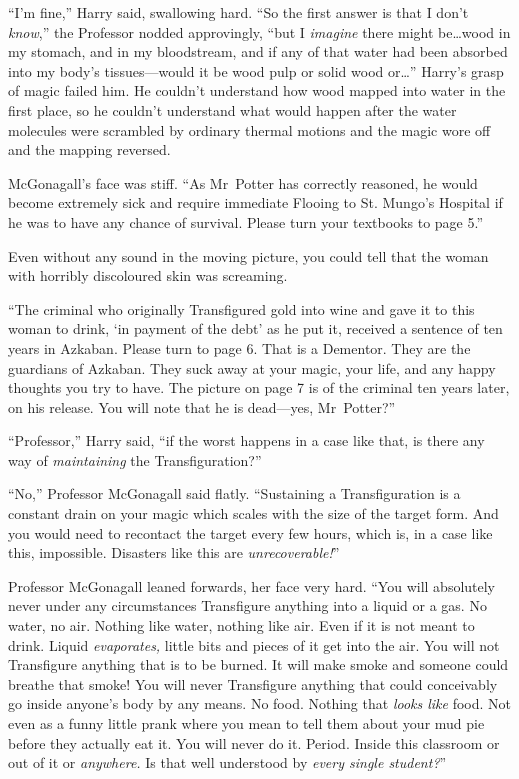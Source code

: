 “I’m fine,” Harry said, swallowing hard. “So the first answer is that I don’t
\emph{know},” the Professor nodded approvingly, “but I \emph{imagine} there
might be…wood in my stomach, and in my bloodstream, and if any of that
water had been absorbed into my body’s tissues—would it be wood pulp or
solid wood or…” Harry’s grasp of magic failed him. He couldn’t
understand how wood mapped into water in the first place, so he couldn’t
understand what would happen after the water molecules were scrambled by
ordinary thermal motions and the magic wore off and the mapping reversed.

McGonagall’s face was stiff. “As Mr~Potter has correctly reasoned, he would
become extremely sick and require immediate Flooing to St. Mungo’s Hospital if
he was to have any chance of survival. Please turn your textbooks to page 5.”

Even without any sound in the moving picture, you could tell that the woman
with horribly discoloured skin was screaming.

“The criminal who originally Transfigured gold into wine and gave it to this
woman to drink, ‘in payment of the debt’ as he put it, received a sentence of
ten years in Azkaban. Please turn to page 6. That is a Dementor. They are the
guardians of Azkaban. They suck away at your magic, your life, and any happy
thoughts you try to have. The picture on page 7 is of the criminal ten years
later, on his release. You will note that he is dead—yes, Mr~Potter?”

“Professor,” Harry said, “if the worst happens in a case like that, is there
any way of \emph{maintaining} the Transfiguration?”

“No,” Professor McGonagall said flatly. “Sustaining a Transfiguration is a
constant drain on your magic which scales with the size of the target form. And
you would need to recontact the target every few hours, which is, in a case
like this, impossible. Disasters like this are \emph{unrecoverable!}”

Professor McGonagall leaned forwards, her face very hard. “You will absolutely
never under any circumstances Transfigure anything into a liquid or a gas. No
water, no air. Nothing like water, nothing like air. Even if it is not meant to
drink. Liquid \emph{evaporates,} little bits and pieces of it get into the air.
You will not Transfigure anything that is to be burned. It will make smoke and
someone could breathe that smoke! You will never Transfigure anything that
could conceivably go inside anyone’s body by any means. No food. Nothing that
\emph{looks like} food. Not even as a funny little prank where you mean to tell
them about your mud pie before they actually eat it. You will never do it.
Period. Inside this classroom or out of it or \emph{anywhere.} Is that well
understood by \emph{every single student?}”

